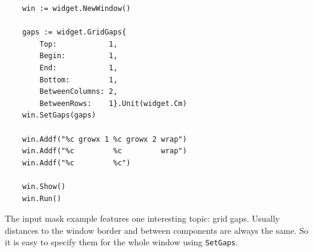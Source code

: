 \begin{verbatim}
    win := widget.NewWindow()

    gaps := widget.GridGaps{
        Top:            1,
        Begin:          1,
        End:            1,
        Bottom:         1,
        BetweenColumns: 2,
        BetweenRows:    1}.Unit(widget.Cm)
    win.SetGaps(gaps)

    win.Addf("%c growx 1 %c growx 2 wrap")
    win.Addf("%c         %c         wrap")
    win.Addf("%c         %c")

    win.Show()
    win.Run()
\end{verbatim}

The input mask example features one interesting topic: grid gaps.
Usually distances to the window border and between components are always
the same. So it is easy to specify them for the whole window using
\texttt{SetGaps}.

